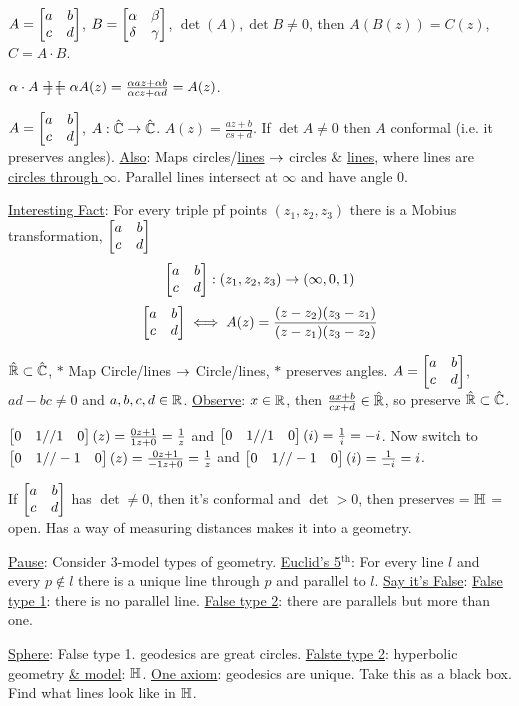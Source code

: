 \documentclass[]{article}
\begin{document}
\begin{example}
	$A = \begin{bmatrix}a & b \\ c & d\end{bmatrix}$, $B = \begin{bmatrix}\alpha & \beta \\ \delta & \gamma\end{bmatrix}$, $\det(A),\det{B}\neq 0$, then $A(B(z)) = C(z)$, $C = A\cdot B$.
\end{example}
$\alpha \cdot A = \begin{bmatrix}\end{bmatrix} = \alpha A(z) = \frac{\alpha a z + \alpha b}{\alpha c z + \alpha d} = A(z)$.

$ A = \begin{bmatrix}a & b \\ c & d\end{bmatrix}$, $A:\hat{\mathbb{C}} \rightarrow \hat{\mathbb{C}}$. $A(z) = \frac{az+b}{cs+d}$. If $\det{A} \neq 0$ then $A$ conformal (i.e. it preserves angles). \ul{Also}: Maps circles/\ul{lines} $\rightarrow$ circles \& \ul{lines}, where lines are \ul{circles through $\infty$}. Parallel lines intersect at $\infty$ and have angle 0.

\ul{Interesting Fact}: For every triple pf points $(z_1,z_2,z_3)$ there is a Mobius transformation, $\begin{bmatrix}a & b \\ c & d\end{bmatrix}$ 
$$ \begin{bmatrix}a&b\\c&d\end{bmatrix}:(z_1,z_2,z_3) \rightarrow (\infty,0,1)$$
$$ \begin{bmatrix}a&b\\c&d\end{bmatrix} \iff A(z) = \frac{(z-z_2)(z_3-z_1)}{(z-z_1)(z_3-z_2)}$$

$\hat{\mathbb{R}} \subset \hat{\mathbb{C}}$, $*$ Map Circle/lines $\rightarrow$ Circle/lines, $*$ preserves angles. $A = \begin{bmatrix}a&b\\c&d\end{bmatrix}$, $ad-bc \neq 0$ and $a,b,c,d\in\mathbb{R}$. \ul{Observe}: $x\in\mathbb{R}$, then $\frac{ax+b}{cx+d} \in\hat{\mathbb{R}}$, so preserve $\hat{\mathbb{R}}\subset \hat{\mathbb{C}}$.

\begin{example}
	$\begin{bmatrix}0&1//1&0\end{bmatrix}(z) = \frac{0z+1}{1z+0} = \frac{1}{z}$ and $\begin{bmatrix}0&1//1&0\end{bmatrix}(i) = \frac{1}{i} = -i$. Now switch to $\begin{bmatrix}0&1//-1&0\end{bmatrix}(z) = \frac{0z+1}{-1z+0} = \frac{1}{z}$ and $\begin{bmatrix}0&1//-1&0\end{bmatrix}(i) = \frac{1}{-i} = i$.
\end{example}
\begin{fact}
	If $\begin{bmatrix}a&b\\c&d\end{bmatrix}$ has $\det \neq 0$, then it's conformal and $\det>0$, then preserves  = $\mathbb{H}$ = open. Has a way of measuring distances makes it into a geometry.
\end{fact}
\ul{Pause}: Consider 3-model types of geometry. \ul{Euclid's 5$^\text{th}$}: For every line $l$ and every $p\notin l$ there is a unique line through $p$ and parallel to $l$. \ul{Say it's False}: \ul{False type 1}: there is no parallel line. \ul{False type 2}: there are parallels but more than one.
\begin{example}
	\ul{Sphere}: False type 1.  geodesics are great circles. \ul{Falste type 2}: hyperbolic geometry \ul{\& model}: $\mathbb{H}$. \ul{One axiom}: geodesics are unique. Take this as a black box. Find what lines look like in $\mathbb{H}$.
\end{example}
\end{document}
